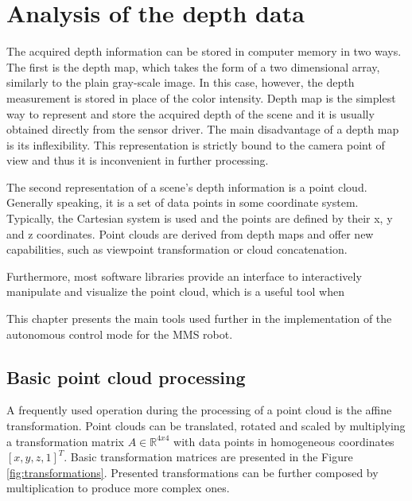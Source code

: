 \chapter{Analysis of the depth data}
\label{cha:analysis}

The acquired depth information can be stored in computer memory in two ways. The first is the depth map, which takes the form of a two dimensional array, similarly to the plain gray-scale image. In this case, however, the depth measurement is stored in place of the color intensity. Depth map is the simplest way to represent and store the acquired depth of the scene and it is usually obtained directly from the sensor driver. The main disadvantage of a depth map is its inflexibility. This representation is strictly bound to the camera point of view and thus it is inconvenient in further processing.

The second representation of a scene's depth information is a point cloud. Generally speaking, it is a set of data points in some coordinate system. Typically, the Cartesian system is used and the points are defined by their x, y and z coordinates. Point clouds are derived from depth maps and offer new capabilities, such as viewpoint transformation or cloud concatenation.

 Furthermore, most software libraries provide an interface to interactively manipulate and visualize the point cloud, which is a useful tool when 

This chapter presents the main tools used further in the implementation of the autonomous control mode for the MMS robot.


\section{Basic point cloud processing}
\label{sec:pointclouds}

A frequently used operation during the processing of a point cloud is the affine transformation. Point clouds can be translated, rotated and scaled by multiplying a transformation matrix $A \in \mathbb{R}^{4x4}$ with data points in homogeneous coordinates $[x,y,z,1]^T$. Basic transformation matrices are presented in the Figure \ref{fig:transformations}. Presented transformations can be further composed by multiplication to produce more complex ones.

